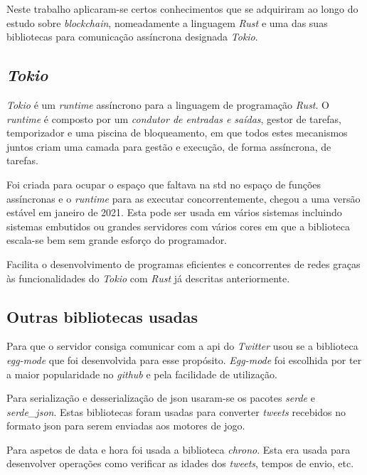 Neste trabalho aplicaram-se certos conhecimentos que se adquiriram ao longo do estudo sobre \textit{blockchain}, nomeadamente a linguagem \textit{Rust} e uma das suas bibliotecas para comunicação assíncrona designada \textit{Tokio}.

\subsection{\textit{Tokio}}

\textit{Tokio} é um \textit{runtime} assíncrono para a linguagem de programação \textit{Rust}.
O \textit{runtime} é composto por um \textit{condutor de entradas e saídas}, gestor de tarefas, temporizador e uma piscina de bloqueamento, em que todos estes mecanismos juntos criam uma camada para gestão e execução, de forma assíncrona, de tarefas.

Foi criada para ocupar o espaço que faltava na \acrshort{std} no espaço de funções assíncronas e o \textit{runtime} para as executar concorrentemente, chegou a uma versão estável em janeiro de 2021. Esta pode ser usada em vários sistemas incluindo sistemas embutidos ou grandes servidores com vários cores em que a biblioteca escala-se bem sem grande esforço do programador.

Facilita o desenvolvimento de programas eficientes e concorrentes de redes graças às funcionalidades do \textit{Tokio} com \textit{Rust} já descritas anteriormente. \cite{rust-fearless}

\subsection{Outras bibliotecas usadas}

Para que o servidor consiga comunicar com a \acrshort{api} do \textit{Twitter} usou se a biblioteca \textit{egg-mode} que foi desenvolvida para esse propósito. \cite{egg-mode_github}
\textit{Egg-mode} foi escolhida por ter a maior popularidade no \textit{github} e pela facilidade de utilização.

Para serialização e desserialização de \acrshort{json} usaram-se os pacotes \textit{serde} e \textit{serde\_json}. Estas bibliotecas foram usadas para converter \textit{tweets} recebidos no formato \acrshort{json} para serem enviadas aos motores de jogo.

Para aspetos de data e hora foi usada a biblioteca \textit{chrono}. Esta era usada para desenvolver operações como verificar as idades dos \textit{tweets}, tempos de envio, etc.

